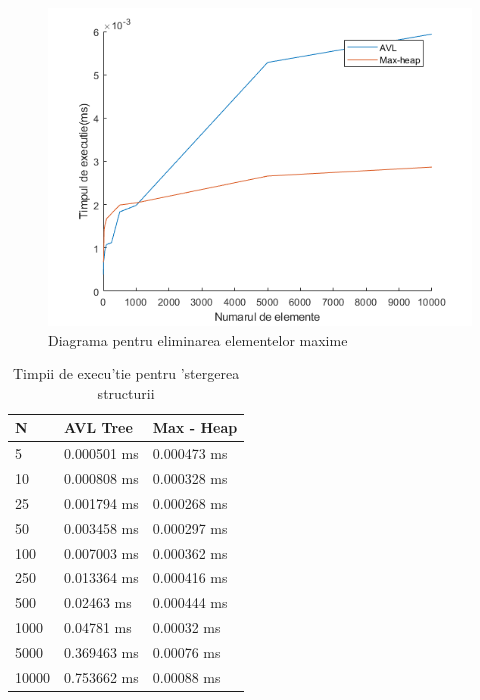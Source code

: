 \begin{figure}[ht]
\centering
\includegraphics[scale=0.8]{Fisiere/DelMax}
\caption {Diagrama pentru eliminarea elementelor maxime}
\end{figure}
\FloatBarrier

\begin{table}[ht]
\centering
\caption{Timpii de execu'tie pentru 'stergerea structurii}
\begin{tabular}{| p{5cm} | p{5cm} | p{5cm} |}
\hline
N & AVL Tree & Max - Heap \\
\hline\hline
5 & 0.000501 ms & 0.000473 ms \\
\hline
10 & 0.000808 ms & 0.000328 ms \\
\hline
25 & 0.001794 ms & 0.000268 ms \\
\hline
50 & 0.003458 ms & 0.000297 ms \\
\hline
100 & 0.007003 ms & 0.000362 ms \\
\hline
250 & 0.013364 ms & 0.000416 ms \\
\hline
500 & 0.02463 ms & 0.000444 ms \\
\hline
1000 & 0.04781 ms & 0.00032 ms \\
\hline
5000 & 0.369463 ms & 0.00076 ms \\
\hline
10000 & 0.753662 ms & 0.00088 ms \\
\hline
\end{tabular}
\end{table}
\FloatBarrier

